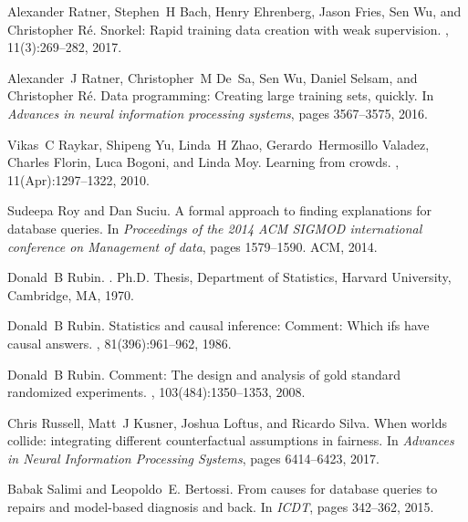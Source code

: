 Alexander Ratner, Stephen~H Bach, Henry Ehrenberg, Jason Fries, Sen Wu, and
  Christopher R{\'e}.
\newblock Snorkel: Rapid training data creation with weak supervision.
, 11(3):269--282, 2017.

Alexander~J Ratner, Christopher~M De~Sa, Sen Wu, Daniel Selsam, and Christopher
  R{\'e}.
\newblock Data programming: Creating large training sets, quickly.
\newblock In {\em Advances in neural information processing systems}, pages
  3567--3575, 2016.

Vikas~C Raykar, Shipeng Yu, Linda~H Zhao, Gerardo~Hermosillo Valadez, Charles
  Florin, Luca Bogoni, and Linda Moy.
\newblock Learning from crowds.
, 11(Apr):1297--1322, 2010.

Sudeepa Roy and Dan Suciu.
\newblock A formal approach to finding explanations for database queries.
\newblock In {\em Proceedings of the 2014 ACM SIGMOD international conference
  on Management of data}, pages 1579--1590. ACM, 2014.

Donald~B Rubin.
.
\newblock Ph.D. Thesis, Department of Statistics, Harvard University,
  Cambridge, MA, 1970.

Donald~B Rubin.
\newblock Statistics and causal inference: Comment: Which ifs have causal
  answers.
,
  81(396):961--962, 1986.

Donald~B Rubin.
\newblock Comment: The design and analysis of gold standard randomized
  experiments.
,
  103(484):1350--1353, 2008.

Chris Russell, Matt~J Kusner, Joshua Loftus, and Ricardo Silva.
\newblock When worlds collide: integrating different counterfactual assumptions
  in fairness.
\newblock In {\em Advances in Neural Information Processing Systems}, pages
  6414--6423, 2017.

Babak Salimi and Leopoldo~E. Bertossi.
\newblock From causes for database queries to repairs and model-based diagnosis
  and back.
\newblock In {\em ICDT}, pages 342--362, 2015.

